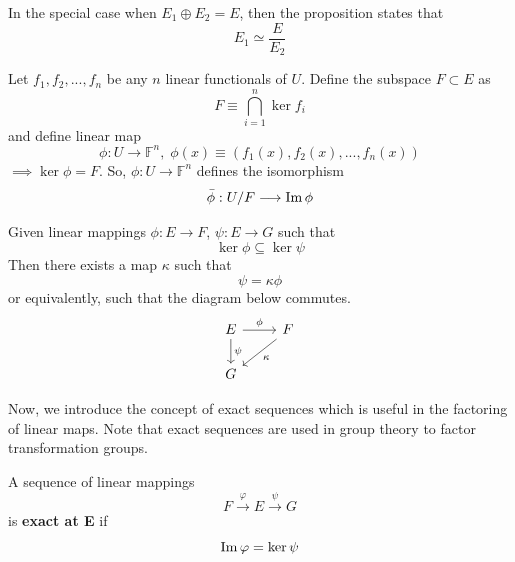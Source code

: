  \begin{corollary}
    In the special case when $E_1 \oplus E_2 = E$, then the proposition states that 
    \begin{equation}
      E_1 \simeq \frac{E}{E_2}
    \end{equation}
  \end{corollary}

  Let $f_1, f_2, ..., f_n$ be any $n$ linear functionals of $U$. Define the subspace $F \subset E$ as 
  \begin{equation}
    F \equiv \bigcap_{i=1}^n \ker{f_i}
  \end{equation}
  and define linear map 
  \begin{equation}
    \phi: U \longrightarrow \mathbb{F}^n, \;\phi(x) \equiv (f_1(x), f_2(x), ..., f_n(x))
  \end{equation}
  $\implies \ker{\phi} = F$. So, $\phi: U \longrightarrow \mathbb{F}^n$ defines the isomorphism 
  \begin{equation}
    \bar{\phi}: U / F \longrightarrow \im{\phi}
  \end{equation}

  \begin{proposition}
    Given linear mappings $\phi: E \longrightarrow F$, $\psi: E \longrightarrow G$ such that
    \begin{equation}
      \ker{\phi} \subseteq \ker{\psi}
    \end{equation}
    Then there exists a map $\kappa$ such that 
    \begin{equation}
      \psi = \kappa \phi
    \end{equation}
    or equivalently, such that the diagram below commutes. 
    \[\begin{tikzcd} 
        E \arrow{r}{\phi} \arrow{d}{\psi} & F \arrow{dl}{\kappa} \\
        G 
    \end{tikzcd}\]
  \end{proposition}

  Now, we introduce the concept of exact sequences which is useful in the factoring of linear maps. Note that exact sequences are used in group theory to factor transformation groups. 

  \begin{definition}
    A sequence of linear mappings 
    \begin{equation}
      F \xrightarrow{\varphi} E \xrightarrow{\psi} G
    \end{equation}
    is \textbf{exact at E} if
    \begin{equation}
      \im{\varphi} = \ker{\psi}
    \end{equation}
  \end{definition}

